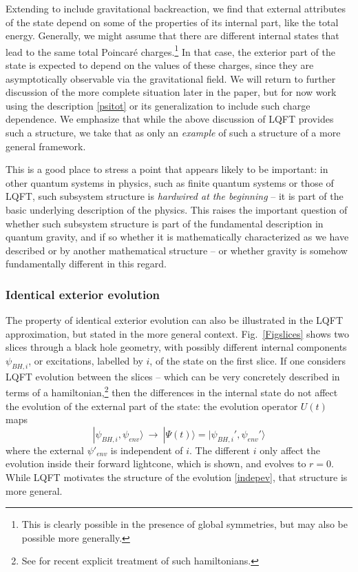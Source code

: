 \documentclass[12pt]{article}
\numberwithin{equation}{section}
\newcommand{\beq}{\begin{equation}}
\newcommand{\eeq}{\end{equation}}
\begin{document}
Extending to include gravitational backreaction, we find that external attributes of the state depend on some of the properties of its internal part, like the total energy.  Generally, we might assume that there are different internal states that lead to the same total Poincar\'e charges.\footnote{This is clearly possible in the presence of global symmetries, but may also be possible more generally.}  In that case, the exterior part of the state is expected to depend on the values of these charges, since they are asymptotically observable via the gravitational field\cite{DoGi4,SGsplit}.  We will return to further discussion of the more complete situation later in the paper, but for now work using the description \eqref{psitot} or its generalization to include such charge dependence.  We emphasize that while the above discussion of LQFT provides such a structure, we take that as only an {\it example} of such a structure of a more general framework.

This is a good place to stress a point that appears likely to be important: in other quantum systems in physics, such as finite quantum systems or those of LQFT, such subsystem structure is {\it hardwired at the beginning} -- it is part of the basic underlying description of the physics.  This raises the important question of whether such subsystem structure is part of the fundamental description in quantum gravity, and if so whether it is mathematically characterized as we have described or by another mathematical 
structure\cite{SGalg}\cite{QFG}\cite{DoGi4,SGsplit} -- or whether gravity is somehow fundamentally different in this regard.

\subsubsection{Identical exterior evolution}

The property of identical exterior evolution can also be illustrated in the LQFT approximation, but stated in the more general context.  Fig.~\ref{Figslices} shows two slices through a black hole geometry, with possibly different internal components $\psi_{BH,i}$, or excitations, labelled by $i$, of the state on the first slice.  If one considers LQFT evolution between the slices -- which can be very concretely described in terms of a hamiltonian,\footnote{See \cite{SGsch,SG2d,GiPe} for recent explicit treatment of such hamiltonians.} then the differences in the internal state do not affect the evolution of the external part of the state:  the evolution operator $U(t)$ maps 
\beq\label{indepev}
|\psi_{BH,i},\psi_{env}\rangle\ \rightarrow\ |\Psi(t)\rangle =|\psi_{BH,i}',\psi_{env}'\rangle
\eeq
where
the external $\psi'_{env}$ is independent of $i$.  The different $i$ only affect the evolution inside their forward lightcone, which is shown, and evolves to $r=0$.  While LQFT motivates the structure of the evolution \eqref{indepev}, that structure is more general.
\end{document}
